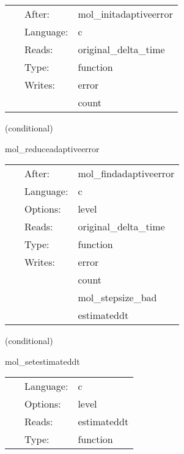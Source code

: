  \begin{tabular*}{160mm}{cll} 
~ & After:  & mol\_initadaptiveerror \\ 
~ & Language:  & c \\ 
~ & Reads:  & original\_delta\_time \\ 
~ & Type:  & function \\ 
~ & Writes:  & error \\ 
~& ~ &count\\ 
\end{tabular*} 


\vspace{5mm}

   (conditional) 

\hspace{5mm} mol\_reduceadaptiveerror 

\hspace{5mm}{\it control the step size: reduce error check variables } 


\hspace{5mm}

 \begin{tabular*}{160mm}{cll} 
~ & After:  & mol\_findadaptiveerror \\ 
~ & Language:  & c \\ 
~ & Options:  & level \\ 
~ & Reads:  & original\_delta\_time \\ 
~ & Type:  & function \\ 
~ & Writes:  & error \\ 
~& ~ &count\\ 
~& ~ &mol\_stepsize\_bad\\ 
~& ~ &estimateddt\\ 
\end{tabular*} 


\vspace{5mm}

   (conditional) 

\hspace{5mm} mol\_setestimateddt 

\hspace{5mm}{\it control the step size: set the new timestep } 


\hspace{5mm}

 \begin{tabular*}{160mm}{cll} 
~ & Language:  & c \\ 
~ & Options:  & level \\ 
~ & Reads:  & estimateddt \\ 
~ & Type:  & function \\ 
\end{tabular*} 


